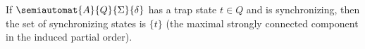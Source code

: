 \begin{lemma}
\label{prelim:lem:sync_und_trap_state}
 If $\semiautomat{A}{Q}{\Sigma}{\delta}$
 has a trap state $t \in Q$ and is synchronizing,
 then the set of synchronizing states is $\{t\}$
 (the maximal strongly connected component in the induced partial order).
\end{lemma}

